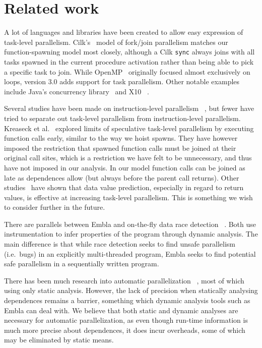 \section{Related work}

A lot of languages and libraries have been created to allow easy
expression of task-level parallelism.  Cilk's~\cite{blumofe96cilk}
model of fork/join parallelism matches our function-spawning model
most closely, although a Cilk {\tt sync} always joins with all tasks 
spawned in the current procedure activation rather than being able to 
pick a specific task to join. While OpenMP~\cite{dagum98openmp} 
originally focused almost exclusively on loops, version 3.0 adds 
support for task parallelism.  Other notable examples
include Java's concurrency library~\cite{lea00java} and X10~
\cite{charles05x10}.

Several studies have been made on instruction-level parallelism~
\cite{wall91limits, postiff99limits, austin92dynamic, lam92limits,
mak09limits}, but fewer have tried to separate out task-level
parallelism from instruction-level parallelism.  Kreaseck et al.\
 explored limits of speculative task-level
parallelism by executing function calls early, similar to the
way we hoist spawns.  They have however imposed the restriction that
spawned function calls must be joined at their original call sites,
which is a restriction we have felt to be unnecessary, and thus have
not imposed in our analysis.  In our model function calls can be
joined as late as dependences allow (but always before the parent
call returns).  Other studies~\cite{warg01limits, oplinger99insearch}
have shown that data value prediction, especially in regard to return
values, is effective at increasing task-level parallelism.  This is
something we wish to consider further in the future.

There are parallels between Embla and on-the-fly data race detection~
\cite{MellorCrummey91onthefly, ha02space, savage97eraser}.  Both use
instrumentation to infer properties of the program through dynamic
analysis.  The main difference is that while race detection seeks to
find unsafe parallelism (i.e.\ bugs) in an explicitly multi-threaded
program, Embla seeks to find potential safe parallelism in a
sequentially written program.

There has been much research into automatic parallelization~
\cite{kennedy02optimizing, Blume94polaris, ottoni05automatic,
ottoni07global}, most of which using only static analysis.  However,
the lack of precision when statically analysing dependences remains a
barrier, something which dynamic analysis tools such as Embla can deal
with.  We believe that both static and dynamic analyses are necessary
for automatic parallelization, as even though run-time information is
much more precise about dependences, it does incur overheads, some of
which may be eliminated by static means.

